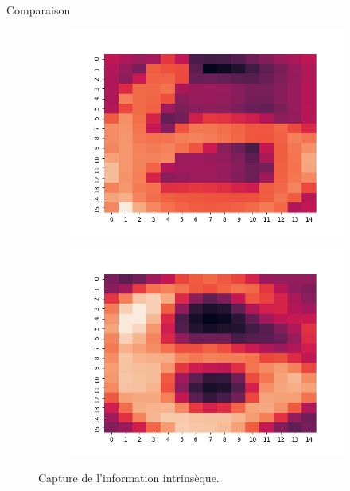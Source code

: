 \documentclass[hyperref={pdfpagelabels=false}]{beamer}
\begin{document}
    \begin{frame}{Comparaison}
        \begin{figure}[h]
            \centering
            \begin{subfigure}[c]{0.3\textwidth}
                \includegraphics[scale=.20]{o6}
            \end{subfigure}
            \begin{subfigure}[c]{0.3\textwidth}
                \includegraphics[scale=.20]{6}
            \end{subfigure}
            \hfill
            \caption{Capture de l'information intrinsèque.}
        \end{figure}
    \end{frame}
\end{document}
